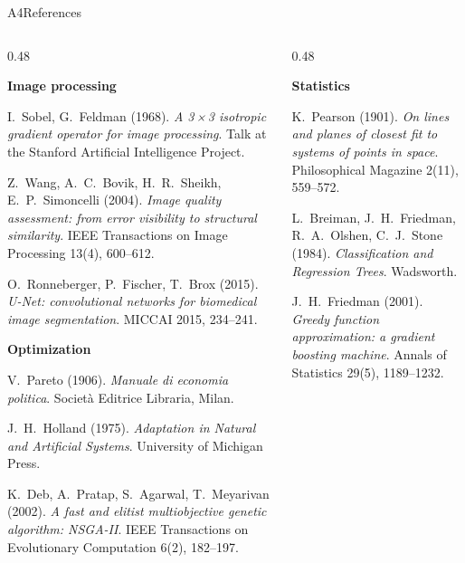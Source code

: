 \begin{frame}{A4\enspace References}
  \begin{columns}[T,onlytextwidth]
  \begin{column}{0.48\textwidth}
  \scriptsize\setlength\parskip{0.6mm}\raggedright
  \textbf{Image processing}\par
  I.~Sobel, G.~Feldman (1968). \emph{A 3\,×\,3 isotropic gradient operator for image processing}. Talk at the Stanford
  Artificial Intelligence Project.\par
  Z.~Wang, A.~C.~Bovik, H.~R.~Sheikh, E.~P.~Simoncelli (2004). \emph{Image quality assessment: from error visibility
  to structural similarity}. IEEE Transactions on Image Processing 13(4), 600--612.\par
  O.~Ronneberger, P.~Fischer, T.~Brox (2015). \emph{U-Net: convolutional networks for biomedical image
  segmentation}. MICCAI 2015, 234--241.\par
  \textbf{Optimization}\par
  V.~Pareto (1906). \emph{Manuale di economia politica}. Società Editrice Libraria, Milan.\par
  J.~H.~Holland (1975). \emph{Adaptation in Natural and Artificial Systems}. University of Michigan Press.\par
  K.~Deb, A.~Pratap, S.~Agarwal, T.~Meyarivan (2002). \emph{A fast and elitist multiobjective genetic algorithm:
  NSGA-II}. IEEE Transactions on Evolutionary Computation 6(2), 182--197.\par
  \end{column}
  \begin{column}{0.48\textwidth}
  \scriptsize\setlength\parskip{0.6mm}\raggedright
  \textbf{Statistics}\par
  K.~Pearson (1901). \emph{On lines and planes of closest fit to systems of points in space}. Philosophical
  Magazine 2(11), 559--572.\par
  L.~Breiman, J.~H.~Friedman, R.~A.~Olshen, C.~J.~Stone (1984). \emph{Classification and Regression Trees}.
  Wadsworth.\par
  J.~H.~Friedman (2001). \emph{Greedy function approximation: a gradient boosting machine}. Annals of Statistics
  29(5), 1189--1232.\par
  \end{column}
  \end{columns}
\end{frame}
